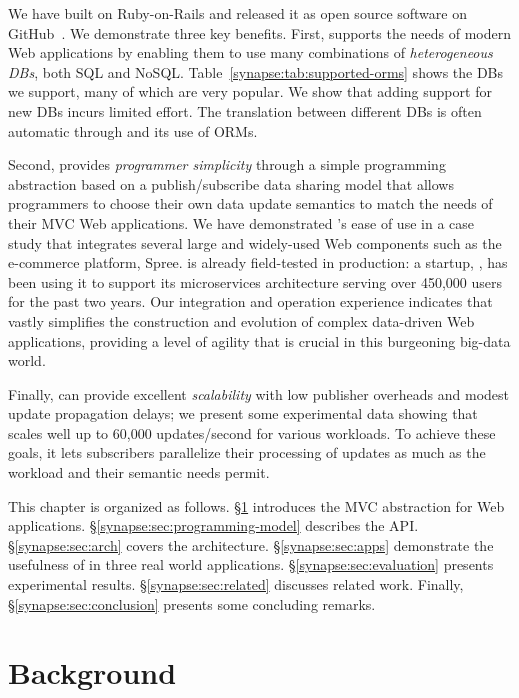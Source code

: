We have built \synapse on Ruby-on-Rails and released it as open source software
 on GitHub~\cite{synapse-sources}. We demonstrate three
key benefits.  First, \synapse supports the needs of modern Web
applications by enabling them to use many combinations of
\emph{heterogeneous DBs}, both SQL and NoSQL. Table~\ref{synapse:tab:supported-orms}
shows the DBs we support, many of which are very popular.
We show that adding support for new DBs incurs limited effort.  The translation
between different DBs is often automatic through \synapse and its use of ORMs.

Second, \synapse provides
\emph{programmer simplicity} through a simple programming abstraction
based on a publish/subscribe data sharing model that allows programmers to choose their own data update semantics to match the needs of their MVC Web applications.
We have demonstrated \synapse's ease of use in a case study that integrates several large and widely-used Web components such as
the e-commerce platform, Spree.
\synapse is already field-tested in production: a startup, \crowdtap, has been using it to support its microservices architecture serving over 450,000 users for the past two years.
Our integration and operation experience indicates that \synapse vastly
simplifies the construction and evolution of complex data-driven Web
applications, providing a level of agility that is crucial in this
burgeoning big-data world.

Finally, \synapse can provide excellent \emph{scalability} with low publisher
overheads and modest update propagation delays; we present some experimental
data showing that \synapse scales well up to 60,000 updates/second for various
workloads.  To achieve these goals, it lets subscribers parallelize their
processing of updates as much as the workload and their semantic needs
permit.

This chapter is organized as follows.
\S\ref{synapse:sec:motivation} introduces the MVC abstraction for Web applications.
\S\ref{synapse:sec:programming-model} describes the \synapse API.
\S\ref{synapse:sec:arch} covers the \synapse architecture.
\S\ref{synapse:sec:apps} demonstrate the usefulness of \synapse in three real world applications.
\S\ref{synapse:sec:evaluation} presents experimental results.
\S\ref{synapse:sec:related} discusses related work.
Finally, \S\ref{synapse:sec:conclusion} presents some concluding remarks.

\section{Background}
\label{synapse:sec:motivation}

